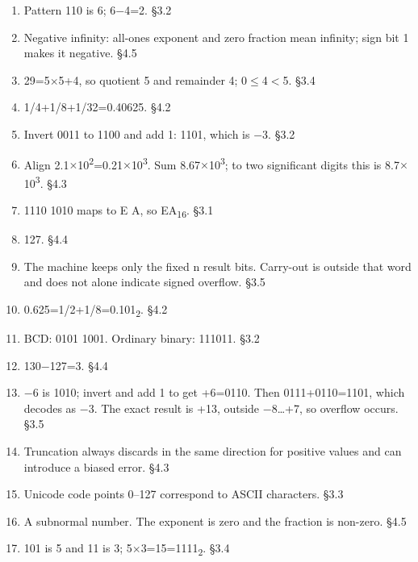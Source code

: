 \documentclass[11pt]{article}
\begin{document}
\begin{keepsection}
\begin{enumerate}
\item Pattern 110 is 6; 6\ensuremath{-}4=2. \hfill{\small\color{FAUblue}§3.2}
\item Negative infinity: all-ones exponent and zero fraction mean infinity; sign bit 1 makes it negative. \hfill{\small\color{FAUblue}§4.5}
\item 29=5\ensuremath{\times}5+4, so quotient 5 and remainder 4; 0\ensuremath{\leq}4\ensuremath{<}5. \hfill{\small\color{FAUblue}§3.4}
\item 1/4+1/8+1/32=0.40625. \hfill{\small\color{FAUblue}§4.2}
\item Invert 0011 to 1100 and add 1: 1101, which is \ensuremath{-}3. \hfill{\small\color{FAUblue}§3.2}
\item Align 2.1\ensuremath{\times}10\textsuperscript{2}=0.21\ensuremath{\times}10\textsuperscript{3}. Sum 8.67\ensuremath{\times}10\textsuperscript{3}; to two significant digits this is 8.7\ensuremath{\times}10\textsuperscript{3}. \hfill{\small\color{FAUblue}§4.3}
\item 1110 1010 maps to E A, so EA\textsubscript{16}. \hfill{\small\color{FAUblue}§3.1}
\item 127. \hfill{\small\color{FAUblue}§4.4}
\item The machine keeps only the fixed n result bits. Carry-out is outside that word and does not alone indicate signed overflow. \hfill{\small\color{FAUblue}§3.5}
\item 0.625=1/2+1/8=0.101\textsubscript{2}. \hfill{\small\color{FAUblue}§4.2}
\item BCD: 0101 1001. Ordinary binary: 111011. \hfill{\small\color{FAUblue}§3.2}
\item 130\ensuremath{-}127=3. \hfill{\small\color{FAUblue}§4.4}
\item \ensuremath{-}6 is 1010; invert and add 1 to get +6=0110. Then 0111+0110=1101, which decodes as \ensuremath{-}3. The exact result is +13, outside \ensuremath{-}8…+7, so overflow occurs. \hfill{\small\color{FAUblue}§3.5}
\item Truncation always discards in the same direction for positive values and can introduce a biased error. \hfill{\small\color{FAUblue}§4.3}
\item Unicode code points 0–127 correspond to ASCII characters. \hfill{\small\color{FAUblue}§3.3}
\item A subnormal number. The exponent is zero and the fraction is non-zero. \hfill{\small\color{FAUblue}§4.5}
\item 101 is 5 and 11 is 3; 5\ensuremath{\times}3=15=1111\textsubscript{2}. \hfill{\small\color{FAUblue}§3.4}

\end{enumerate}
\end{keepsection}
\end{document}
